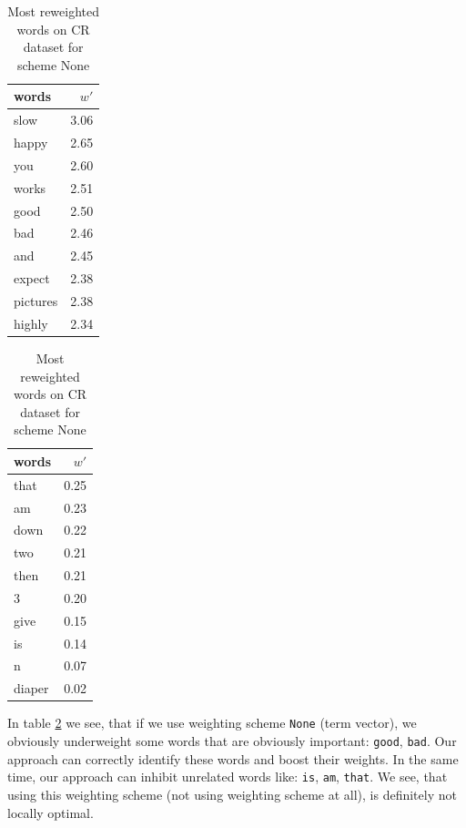 \begin{table}[H]
    \centering
    \begin{minipage}{.4\linewidth}
      \centering
        \begin{tabular}{lr}
\toprule
    words &  $w'$ \\
\midrule
     slow &  3.06 \\
    happy &  2.65 \\
      you &  2.60 \\
    works &  2.51 \\
     good &  2.50 \\
      bad &  2.46 \\
      and &  2.45 \\
   expect &  2.38 \\
 pictures &  2.38 \\
   highly &  2.34 \\
\bottomrule
\end{tabular}

    \end{minipage}
    \begin{minipage}{.4\linewidth}
      \centering
        \begin{tabular}{lr}
\toprule
  words &  $w'$ \\
\midrule
   that &  0.25 \\
     am &  0.23 \\
   down &  0.22 \\
    two &  0.21 \\
   then &  0.21 \\
      3 &  0.20 \\
   give &  0.15 \\
     is &  0.14 \\
      n &  0.07 \\
 diaper &  0.02 \\
\bottomrule
\end{tabular}

    \end{minipage} 
    \caption{Most reweighted words on CR dataset for scheme None}
    \label{tab:words:CR:None}
\end{table}

    In table \ref{tab:words:CR:None} we see, that if we use weighting scheme \texttt{None} (term vector), 
    we obviously underweight some words that are obviously important: \texttt{good}, \texttt{bad}.
    Our approach can correctly identify these words and boost their weights.
    In the same time, our approach can inhibit unrelated words like: \texttt{is}, \texttt{am}, \texttt{that}.
    We see, that using this weighting scheme (not using weighting scheme at all), is definitely not locally optimal.
    
